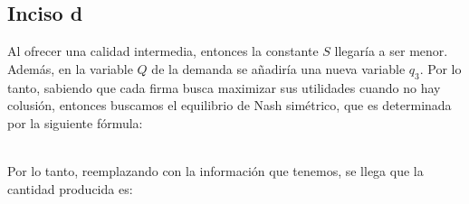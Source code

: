 \documentclass[
	spanish, %
	letterpaper, oneside
]{article}
\begin{document}
\subsection{Inciso d}

	Al ofrecer una calidad intermedia, entonces la constante $S$ llegaría a ser menor. Además, en la variable $Q$ de la demanda se añadiría una nueva variable $q_3$.
	Por lo tanto, sabiendo que cada firma busca maximizar sus utilidades cuando no hay colusión, entonces buscamos el equilibrio de Nash simétrico, que es determinada por la siguiente fórmula:

	 \\

	Por lo tanto, reemplazando con la información que tenemos, se llega que la cantidad producida es:




\end{document}
